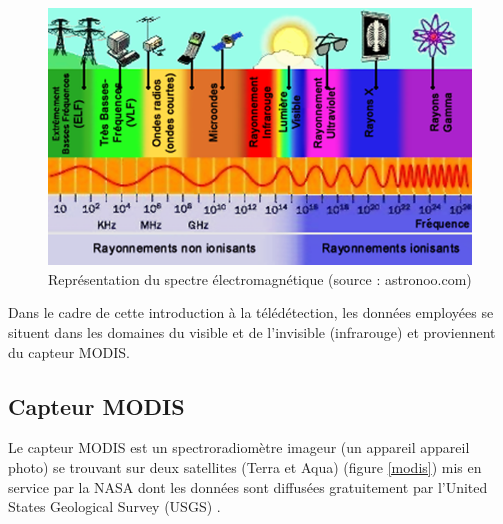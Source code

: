 \documentclass[10pt,a4paper]{article}
\begin{document}
\begin{figure}[!h]
\centering
\includegraphics[scale=0.6]{img/spectre-electromagnetique.png}
\caption{Représentation du spectre électromagnétique (source : astronoo.com)}
\label{spectreElectro}
\end{figure}

Dans le cadre de cette introduction à la télédétection, les données employées se situent dans les domaines du visible et de l'invisible (infrarouge) et proviennent du capteur MODIS.

\subsection{Capteur MODIS}

Le capteur MODIS est un spectroradiomètre imageur (un appareil appareil photo) se trouvant sur deux satellites (Terra et Aqua) (figure \ref{modis}) mis en service par la NASA dont les données sont diffusées gratuitement par l'United States Geological Survey (USGS) .
\end{document}
